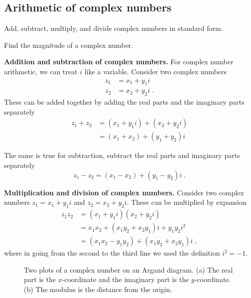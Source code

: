 
\newtexpage
\subsection{Arithmetic of complex numbers}
\label{sec:complex_arithmetic}

\begin{learningoutcomes}
\item Add, subtract, multiply, and divide complex numbers in standard form.
\item Find the magnitude of a complex number.
\end{learningoutcomes}


\textbf{Addition and subtraction of complex numbers.} For complex number arithmetic, we can treat $i$ like a variable. Consider two complex numbers
\begin{align*}
    {z}_{1} &= {x}_{1}+{y}_{1}i \\
    {z}_{2} &= {x}_{2}+{y}_{2}i \; .
\end{align*}
These can be added together by adding the real parts and the imaginary parts separately
\begin{align*}
{z}_{1}+{z}_{2} &=\left({x}_{1}+{y}_{1}i\right)+({x}_{2}+{y}_{2}i) \\
&= {\left({x}_{1}+{x}_{2}\right)} + {\left({y}_{1}+{y}_{2}\right)}i
\end{align*}

The same is true for subtraction, subtract the real parts and imaginary parts separately
\[
{z}_{1}-{z}_{2}={\left({x}_{1}-{x}_{2}\right)} + {\left({y}_{1}-{y}_{2}\right)}i \; .
\]

\textbf{Multiplication and division of complex numbers.} Consider two complex numbers ${z}_{1}={x}_{1}+{y}_{1}i$ and ${z}_{2}={x}_{2}+{y}_{2}i$. These can be multiplied by expansion
\begin{align*}
{z}_{1}{z}_{2} &=\left({x}_{1}+{y}_{1}i\right)\left({x}_{2}+{y}_{2}i\right) \\
&={x}_{1}{x}_{2}+\left({x}_{1}{y}_{2}+{x}_{2}{y}_{1}\right)i+{y}_{1}{y}_{2}{i}^{2} \\
&={\left({x}_{1}{x}_{2}-{y}_{1}{y}_{2}\right)} + {\left({x}_{1}{y}_{2}+{x}_{2}{y}_{1}\right)} i \; ,
\end{align*}
where in going from the second to the third line we used the definition $i^2 = -1$.

\begin{figure}
    \centering
    \caption{Two plots of a complex number on an Argand diagram. (a) The real part is the $x$-coordinate and the imaginary part is the $y$-coordinate. (b) The modulus is the distance from the origin.}
    \label{fig:argand_diagram}
\end{figure}

